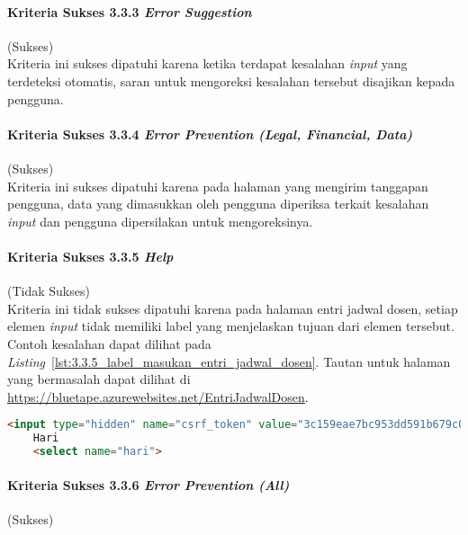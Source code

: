 \paragraph{Kriteria Sukses 3.3.3 \textit{Error Suggestion}}
\label{par:kepatuhan_bluetape_kriteria_sukses_3.3.3}
(Sukses)\\

Kriteria ini sukses dipatuhi karena ketika terdapat kesalahan \textit{input} yang terdeteksi otomatis, saran untuk mengoreksi kesalahan tersebut disajikan kepada pengguna.

\paragraph{Kriteria Sukses 3.3.4 \textit{Error Prevention (Legal, Financial, Data)}}
\label{par:kepatuhan_bluetape_kriteria_sukses_3.3.4}
(Sukses)\\

Kriteria ini sukses dipatuhi karena pada halaman yang mengirim tanggapan pengguna, data yang dimasukkan oleh pengguna diperiksa terkait kesalahan \textit{input} dan pengguna dipersilakan untuk mengoreksinya.

\paragraph{Kriteria Sukses 3.3.5 \textit{Help}}
\label{par:kepatuhan_bluetape_kriteria_sukses_3.3.5}
(Tidak Sukses)\\

Kriteria ini tidak sukses dipatuhi karena pada halaman entri jadwal dosen, setiap elemen \textit{input} tidak memiliki label yang menjelaskan tujuan dari elemen tersebut. Contoh kesalahan dapat dilihat pada \mbox{\textit{Listing} \ref{lst:3.3.5_label_masukan_entri_jadwal_dosen}}. Tautan untuk halaman yang bermasalah dapat dilihat di \url{https://bluetape.azurewebsites.net/EntriJadwalDosen}.

\begin{lstlisting}[frame=single, label={lst:3.3.5_label_masukan_entri_jadwal_dosen}, language=HTML, caption=Pelanggaran Kriteria Sukses 3.3.5 pada Halaman Entri Jadwal Dosen]
    <input type="hidden" name="csrf_token" value="3c159eae7bc953dd591b679c080ed066"/>
    Hari
    <select name="hari">
\end{lstlisting}

\paragraph{Kriteria Sukses 3.3.6 \textit{Error Prevention (All)}}
\label{par:kepatuhan_bluetape_kriteria_sukses_3.3.6}
(Sukses)\\

